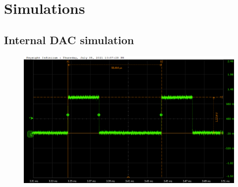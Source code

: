 \section{Simulations}

\subsection{Internal DAC simulation}\label{dactests}

\begin{figure}[H]
	\centering
	\includegraphics[width=0.7\linewidth]{IMG/ch5/probe/09-08-2021_clock-specks}
	\caption{}
	\label{fig:clockspecs}
\end{figure}


